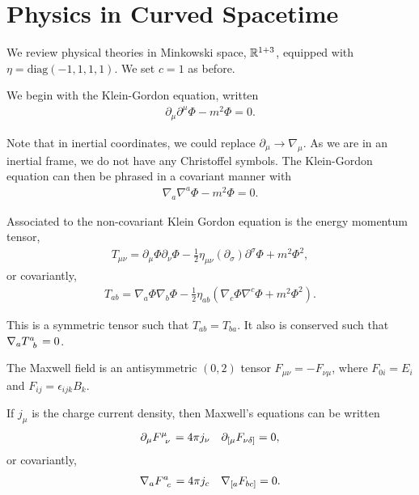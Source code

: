 
\part{Physics in Curved Spacetime}

We review physical theories in Minkowski space, $\mathbb{R}^{1+3}$, equipped with $\eta = \text{diag} \left( -1,1,1,1 \right) $. We set $c = 1$ as before.

We begin with the Klein-Gordon equation, written
\begin{align}
    \partial_\mu \partial^{\mu} \Phi - m^2 \Phi = 0
.\end{align}

Note that in inertial coordinates, we could replace $\partial_\mu \to \nabla_\mu$. As we are in an inertial frame, we do not have any Christoffel symbols. The Klein-Gordon equation can then be phrased in a covariant manner with
\begin{align}
    \nabla_a \nabla^{a} \Phi - m^2 \Phi = 0
.\end{align}

Associated to the non-covariant Klein Gordon equation is the energy momentum tensor,
\begin{align}
    T_{\mu \nu} = \partial_\mu \Phi \partial_\nu \Phi - \frac{1}{2} \eta_{\mu \nu} \left( \partial_\sigma \right)  \partial^{\sigma} \Phi + m^2 \Phi^2
,\end{align}
or covariantly,
\begin{align}
    T_{ab} = \nabla_a \Phi \nabla_b \Phi - \frac{1}{2} \eta_{ab} \left( \nabla_c \Phi \nabla^{c} \Phi + m^2 \Phi^2 \right) 
.\end{align}

This is a symmetric tensor such that $T_{ab} = T_{ba}$. It also is conserved such that $\nabla_a \tensor{T}{^{a}_b} = 0$.

The Maxwell field is an antisymmetric $\left( 0,2 \right) $ tensor $F_{\mu \nu} = - F_{\nu \mu}$, where $F_{0i} = E_i$ and $F_{ij} = \epsilon_{ij k} B_k$. 

If $j_\mu$ is the charge current density, then Maxwell's equations can be written
\begin{align}
    \partial_\mu \tensor{F}{^{\mu}_{\nu}} = 4\pi j_\nu && \partial_{[\mu} F_{\nu \delta ]} = 0
,\end{align}
or covariantly,
\begin{align}
    \nabla_{a} \tensor{F}{^{a}_c} = 4\pi j_c && \nabla_{[a} F_{bc]} = 0
.\end{align}

